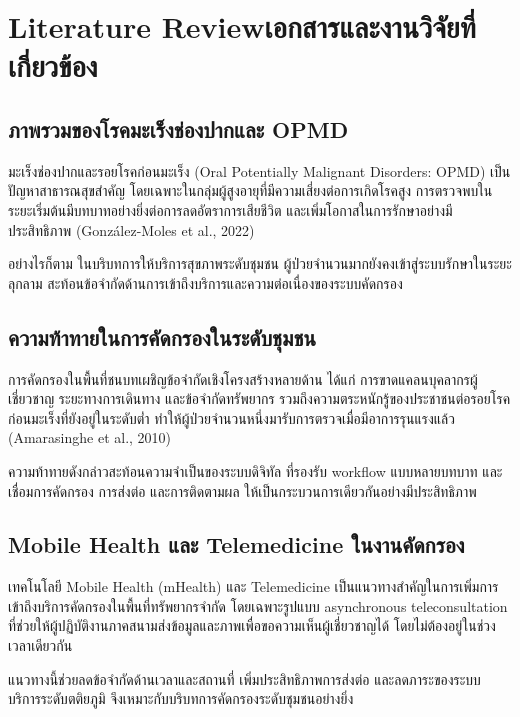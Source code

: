 \chapter{\ifenglish Literature Review\else เอกสารและงานวิจัยที่เกี่ยวข้อง\fi}

\section{ภาพรวมของโรคมะเร็งช่องปากและ OPMD}

มะเร็งช่องปากและรอยโรคก่อนมะเร็ง (Oral Potentially Malignant Disorders: OPMD)
เป็นปัญหาสาธารณสุขสำคัญ โดยเฉพาะในกลุ่มผู้สูงอายุที่มีความเสี่ยงต่อการเกิดโรคสูง
การตรวจพบในระยะเริ่มต้นมีบทบาทอย่างยิ่งต่อการลดอัตราการเสียชีวิต
และเพิ่มโอกาสในการรักษาอย่างมีประสิทธิภาพ (González-Moles et al., 2022)

อย่างไรก็ตาม ในบริบทการให้บริการสุขภาพระดับชุมชน
ผู้ป่วยจำนวนมากยังคงเข้าสู่ระบบรักษาในระยะลุกลาม
สะท้อนข้อจำกัดด้านการเข้าถึงบริการและความต่อเนื่องของระบบคัดกรอง

\section{ความท้าทายในการคัดกรองในระดับชุมชน}

การคัดกรองในพื้นที่ชนบทเผชิญข้อจำกัดเชิงโครงสร้างหลายด้าน
ได้แก่ การขาดแคลนบุคลากรผู้เชี่ยวชาญ ระยะทางการเดินทาง และข้อจำกัดทรัพยากร
รวมถึงความตระหนักรู้ของประชาชนต่อรอยโรคก่อนมะเร็งที่ยังอยู่ในระดับต่ำ
ทำให้ผู้ป่วยจำนวนหนึ่งมารับการตรวจเมื่อมีอาการรุนแรงแล้ว (Amarasinghe et al., 2010)

ความท้าทายดังกล่าวสะท้อนความจำเป็นของระบบดิจิทัล
ที่รองรับ workflow แบบหลายบทบาท และเชื่อมการคัดกรอง การส่งต่อ และการติดตามผล
ให้เป็นกระบวนการเดียวกันอย่างมีประสิทธิภาพ

\section{Mobile Health และ Telemedicine ในงานคัดกรอง}

เทคโนโลยี Mobile Health (mHealth) และ Telemedicine
เป็นแนวทางสำคัญในการเพิ่มการเข้าถึงบริการคัดกรองในพื้นที่ทรัพยากรจำกัด
โดยเฉพาะรูปแบบ asynchronous teleconsultation
ที่ช่วยให้ผู้ปฏิบัติงานภาคสนามส่งข้อมูลและภาพเพื่อขอความเห็นผู้เชี่ยวชาญได้
โดยไม่ต้องอยู่ในช่วงเวลาเดียวกัน

แนวทางนี้ช่วยลดข้อจำกัดด้านเวลาและสถานที่
เพิ่มประสิทธิภาพการส่งต่อ และลดภาระของระบบบริการระดับตติยภูมิ
จึงเหมาะกับบริบทการคัดกรองระดับชุมชนอย่างยิ่ง

